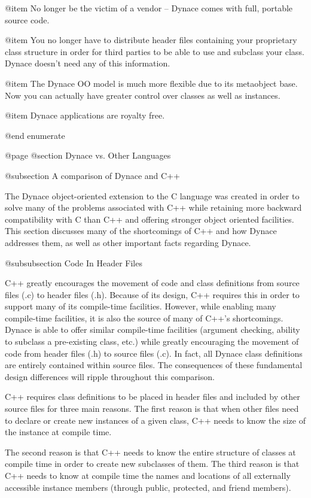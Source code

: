 @item
No longer be the victim of a vendor -- Dynace comes with full, portable
source code.

@item
You no longer have to distribute header files containing your proprietary
class structure in order for third parties to be able to use and
subclass your class.  Dynace doesn't need any of this information.

@item
The Dynace OO model is much more flexible due to its metaobject base.  Now
you can actually have greater control over classes as well as instances.

@item
Dynace applications are royalty free.

@end enumerate


@page
@section Dynace vs. Other Languages

@subsection A comparison of Dynace and C++

The Dynace object-oriented extension to the C language was created in
order to solve many of the problems associated with C++ while retaining
more backward compatibility with C than C++ and offering stronger object
oriented facilities.  This section discusses many of the shortcomings
of C++ and how Dynace addresses them, as well as other important facts
regarding Dynace.

@subsubsection Code In Header Files

C++ greatly encourages the movement of code and class definitions from
source files (.c) to header files (.h).  Because of its design, C++
requires this in order to support many of its compile-time facilities.
However, while enabling many compile-time facilities, it is also the
source of many of C++'s shortcomings.  Dynace is able to offer similar
compile-time facilities (argument checking, ability to subclass a
pre-existing class, etc.) while greatly encouraging the movement of code
from header files (.h) to source files (.c).  In fact, all Dynace
class definitions are entirely contained within source files.  The
consequences of these fundamental design differences will ripple
throughout this comparison.

C++ requires class definitions to be placed in header files and
included by other source files for three main reasons.  The first reason
is that when other files need to declare or create new instances of
a given class, C++ needs to know the size of the instance at compile
time.

The second reason is that C++ needs to know the entire structure of
classes at compile time in order to create new subclasses of them.
The third reason is that C++ needs to know at compile time the names
and locations of all externally accessible instance members (through
public, protected, and friend members).

